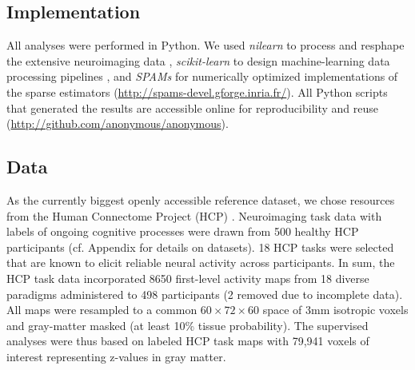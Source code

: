 \documentclass{article}
\begin{document}
\subsection{Implementation}
All analyses were performed in Python.
We used \textit{nilearn} to process and resphape
the extensive neuroimaging data 
\cite{abrah14},
\textit{scikit-learn} to design machine-learning
data processing pipelines
\cite{pedr11},
and
\textit{SPAMs} for numerically optimized
implementations of the sparse estimators
(\url{http://spams-devel.gforge.inria.fr/}).
All Python scripts that generated the results are
accessible online for reproducibility and reuse
(\url{http://github.com/anonymous/anonymous}).
  

%
\subsection{Data}
As the currently biggest openly accessible reference dataset,
we chose resources from the Human Connectome Project (HCP)
\cite{barch2013}.
Neuroimaging task data with labels of ongoing cognitive processes
were drawn from 500
healthy HCP participants (cf. Appendix for details on datasets).
18 HCP tasks 
were selected that are known to elicit reliable neural activity
across participants.
In sum, the HCP task data incorporated 8650 first-level activity maps
from 18 diverse paradigms administered to 498 participants (2 removed
due to incomplete data).
All maps were resampled to a common $60\times72\times60$ space of
3mm isotropic voxels and gray-matter masked (at least 10\% tissue
probability).
The supervised analyses were thus based on labeled HCP task maps with
79,941 voxels of interest representing z-values in gray matter.
\end{document}
